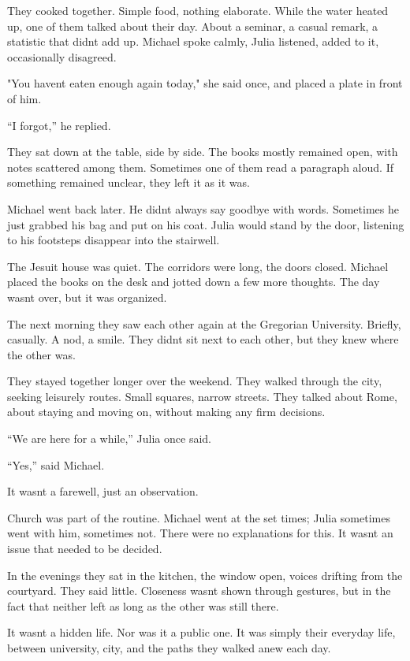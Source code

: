 \documentclass[
]{article}
\begin{document}
They cooked together. Simple food, nothing elaborate. While the water heated up, one of them talked about their day. About a seminar, a casual remark, a statistic that didn\textquotesingle t add up. Michael spoke calmly, Julia listened, added to it, occasionally disagreed.

"You haven\textquotesingle t eaten enough again today," she said once, and placed a plate in front of him.

``I forgot,'' he replied.

They sat down at the table, side by side. The books mostly remained open, with notes scattered among them. Sometimes one of them read a paragraph aloud. If something remained unclear, they left it as it was.

Michael went back later. He didn\textquotesingle t always say goodbye with words. Sometimes he just grabbed his bag and put on his coat. Julia would stand by the door, listening to his footsteps disappear into the stairwell.

The Jesuit house was quiet. The corridors were long, the doors closed. Michael placed the books on the desk and jotted down a few more thoughts. The day wasn\textquotesingle t over, but it was organized.

The next morning they saw each other again at the Gregorian University. Briefly, casually. A nod, a smile. They didn\textquotesingle t sit next to each other, but they knew where the other was.

They stayed together longer over the weekend. They walked through the city, seeking leisurely routes. Small squares, narrow streets. They talked about Rome, about staying and moving on, without making any firm decisions.

``We are here for a while,'' Julia once said.

``Yes,'' said Michael.

It wasn\textquotesingle t a farewell, just an observation.

Church was part of the routine. Michael went at the set times; Julia sometimes went with him, sometimes not. There were no explanations for this. It wasn\textquotesingle t an issue that needed to be decided.

In the evenings they sat in the kitchen, the window open, voices drifting from the courtyard. They said little. Closeness wasn\textquotesingle t shown through gestures, but in the fact that neither left as long as the other was still there.

It wasn\textquotesingle t a hidden life. Nor was it a public one. It was simply their everyday life, between university, city, and the paths they walked anew each day.
\end{document}
